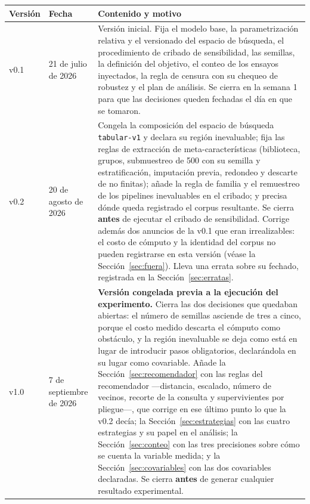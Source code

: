 \documentclass[11pt,letterpaper]{article}
\newcommand{\preregfecha}{7 de septiembre de 2026}
\newcommand{\preregfechauno}{21 de julio de 2026}
\newcommand{\preregfechados}{20 de agosto de 2026}
\begin{document}
\begin{center}
\begin{tabularx}{\textwidth}{L{1.6cm} L{2.4cm} Y}
\toprule
{} \textbf{Versión} & \textbf{Fecha} & \textbf{Contenido y motivo} \\
\midrule
v0.1 & \preregfechauno &
Versión inicial. Fija el modelo base, la parametrización relativa y el versionado
del espacio de búsqueda, el procedimiento de cribado de sensibilidad, las
semillas, la definición del objetivo, el conteo de los ensayos inyectados, la
regla de censura con su chequeo de robustez y el plan de análisis. Se cierra en
la semana 1 para que las decisiones queden fechadas el día en que se tomaron. \\
\midrule
v0.2 & \preregfechados &
Congela la composición del espacio de búsqueda \texttt{tabular-v1} y declara su
región inevaluable; fija las reglas de extracción de meta-características
(biblioteca, grupos, submuestreo de 500 con su semilla y estratificación,
imputación previa, redondeo y descarte de no finitas); añade la regla de familia y
el remuestreo de los pipelines inevaluables en el cribado; y precisa dónde queda
registrado el corpus resultante. Se cierra \textbf{antes} de ejecutar el cribado
de sensibilidad. Corrige además dos anuncios de la v0.1 que eran irrealizables:
el costo de cómputo y la identidad del corpus no pueden registrarse en esta
versión (véase la Sección~\ref{sec:fuera}). Lleva una errata sobre su fechado,
registrada en la Sección~\ref{sec:erratas}. \\
\midrule
v1.0 & \preregfecha &
\textbf{Versión congelada previa a la ejecución del experimento.} Cierra las dos
decisiones que quedaban abiertas: el número de semillas asciende de tres a cinco,
porque el costo medido descarta el cómputo como obstáculo, y la región inevaluable
se deja como está en lugar de introducir pasos obligatorios, declarándola en su
lugar como covariable. Añade la Sección~\ref{sec:recomendador} con las reglas del
recomendador —distancia, escalado, número de vecinos, recorte de la consulta y
supervivientes por pliegue—, que corrige en ese último punto lo que la v0.2 decía;
la Sección~\ref{sec:estrategias} con las cuatro estrategias y su papel en el
análisis; la Sección~\ref{sec:conteo} con las tres precisiones sobre cómo se
cuenta la variable medida; y la Sección~\ref{sec:covariables} con las dos
covariables declaradas. Se cierra \textbf{antes} de generar cualquier resultado
experimental. \\
\bottomrule
\end{tabularx}
\end{center}
\end{document}
